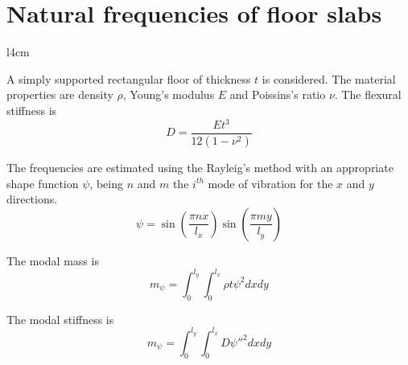 \documentclass{article}
\begin{document}
\section*{Natural frequencies of floor slabs}

\begin{wrapfigure}{l}{4cm}
\vspace{-1em}
\end{wrapfigure}

A simply supported rectangular floor of thickness $t$ is considered. The material properties are density $\rho$, Young's modulus $E$ and Poissins's ratio $\nu$. The flexural stiffness is
$$
D = \frac{Et^3}{12(1-\nu^2)}
$$

The frequencies are estimated using the Rayleig's method with an appropriate shape function $\psi$, being $n$ and $m$ the $i^{th}$ mode of vibration for the $x$ and $y$ directions.
$$
\psi = \sin\left(\frac{\pi nx}{l_x}\right) \sin\left(\frac{\pi my}{l_y}\right)
$$

The modal mass is
$$
m_\psi = \int_0^{l_y}\int_0^{l_x} \rho t \psi^2 dxdy
$$

The modal stiffness is
$$
m_\psi = \int_0^{l_y}\int_0^{l_x} D \psi''^2 dxdy
$$
\end{document}

